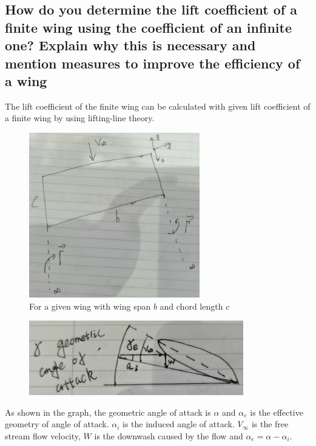 \documentclass[11pt]{article}
\numberwithin{equation}{section}
\begin{document}
\subsection*{How do you determine the lift coefficient of a finite wing using the coefficient of an infinite one? Explain why this is necessary and mention measures to improve the efficiency of a wing}
The lift coefficient of the finite wing can be calculated with given lift coefficient of a finite wing by using lifting-line theory.
\begin{figure}[H]
  \centering
  \includegraphics[width = 0.35 \textwidth]{./img/diagram3.png}
  \caption{For a given wing with wing span $b$ and chord length $c$}
\end{figure}
\begin{figure}[H]
  \centering
  \includegraphics[width = 0.5 \textwidth]{./img/diagram4.png}
  \caption{}
  \label{GeometricAngleOfAttack}
\end{figure}
As shown in the graph, the geometric angle of attack is $\alpha$ and $\alpha_e$ is the effective geometry of angle of attack. $\alpha_i$ is the induced angle of attack. $V_{\infty}$ is the free stream flow velocity, $W$ is the downwash caused by the flow and $\alpha_e = \alpha - \alpha_i$. 
\end{document}
